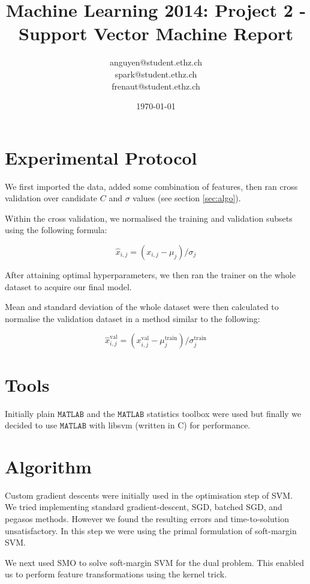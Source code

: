 \documentclass[a4paper, 11pt]{article}
\title{Machine Learning 2014: Project 2 - Support Vector Machine Report}
\author{anguyen@student.ethz.ch\\ spark@student.ethz.ch\\ frenaut@student.ethz.ch\\}
\date{\today}
\begin{document}
\maketitle

\section*{Experimental Protocol}
We first imported the data, added some combination of features, then ran cross
validation over candidate $C$ and $\sigma$ values (see section \ref{sec:algo}).

Within the cross validation, we normalised the training and validation subsets
using the following formula:

\begin{equation}
	\hat{x}_{i,j} = \left(x_{i,j} - \mu_j \right) / \sigma_j
\end{equation}

After attaining optimal hyperparameters, we then ran the trainer on the whole
dataset to acquire our final model.

Mean and standard deviation of the whole dataset were then calculated to
normalise the validation dataset in a method similar to the following:

\begin{equation}
	\hat{x}^{\mathrm{val}}_{i,j} = \left(x^{\mathrm{val}}_{i,j} -
		\mu^{\mathrm{train}}_j \right) / \sigma^{\mathrm{train}}_j
\end{equation}

\section{Tools}
Initially plain $\mathtt{MATLAB}$ and the $\mathtt{MATLAB}$ statistics toolbox
were used but finally we decided to use $\mathtt{MATLAB}$ with libsvm (written
in C) for performance.


\section{Algorithm\label{sec:algo}}
Custom gradient descents were initially used in the optimisation step of SVM.
We tried implementing standard gradient-descent, SGD, batched SGD, and pegasos
methods. However we found the resulting errors and time-to-solution unsatisfactory.
In this step we were using the primal formulation of soft-margin SVM.

We next used SMO to solve soft-margin SVM for the dual problem. This enabled us
to perform feature transformations using the kernel trick.
\end{document}
